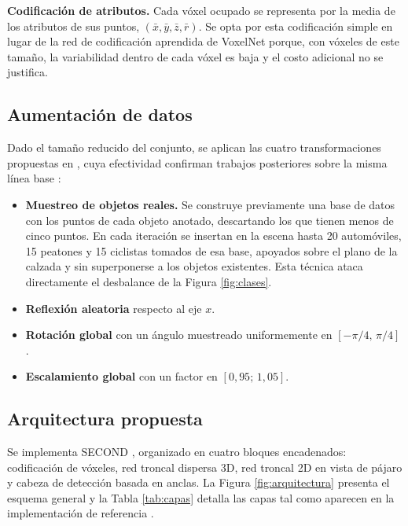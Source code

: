 \documentclass[11pt,letterpaper]{article}
\begin{document}
\textbf{Codificación de atributos.} Cada vóxel ocupado se representa por la media de los atributos de sus puntos, $(\bar{x}, \bar{y}, \bar{z}, \bar{r})$. Se opta por esta codificación simple en lugar de la red de codificación aprendida de VoxelNet \cite{zhou2018} porque, con vóxeles de este tamaño, la variabilidad dentro de cada vóxel es baja y el costo adicional no se justifica.

\subsection{Aumentación de datos}

Dado el tamaño reducido del conjunto, se aplican las cuatro transformaciones propuestas en \cite{yan2018}, cuya efectividad confirman trabajos posteriores sobre la misma línea base \cite{ke2025, ao2026}:

\begin{itemize}
\item \textbf{Muestreo de objetos reales.} Se construye previamente una base de datos con los puntos de cada objeto anotado, descartando los que tienen menos de cinco puntos. En cada iteración se insertan en la escena hasta 20 automóviles, 15 peatones y 15 ciclistas tomados de esa base, apoyados sobre el plano de la calzada y sin superponerse a los objetos existentes. Esta técnica ataca directamente el desbalance de la Figura \ref{fig:clases}.
\item \textbf{Reflexión aleatoria} respecto al eje $x$.
\item \textbf{Rotación global} con un ángulo muestreado uniformemente en $[-\pi/4,\, \pi/4]$.
\item \textbf{Escalamiento global} con un factor en $[0{,}95;\, 1{,}05]$.
\end{itemize}

\subsection{Arquitectura propuesta}

Se implementa SECOND \cite{yan2018}, organizado en cuatro bloques encadenados: codificación de vóxeles, red troncal dispersa 3D, red troncal 2D en vista de pájaro y cabeza de detección basada en anclas. La Figura \ref{fig:arquitectura} presenta el esquema general y la Tabla \ref{tab:capas} detalla las capas tal como aparecen en la implementación de referencia \cite{openpcdet}.
\end{document}
